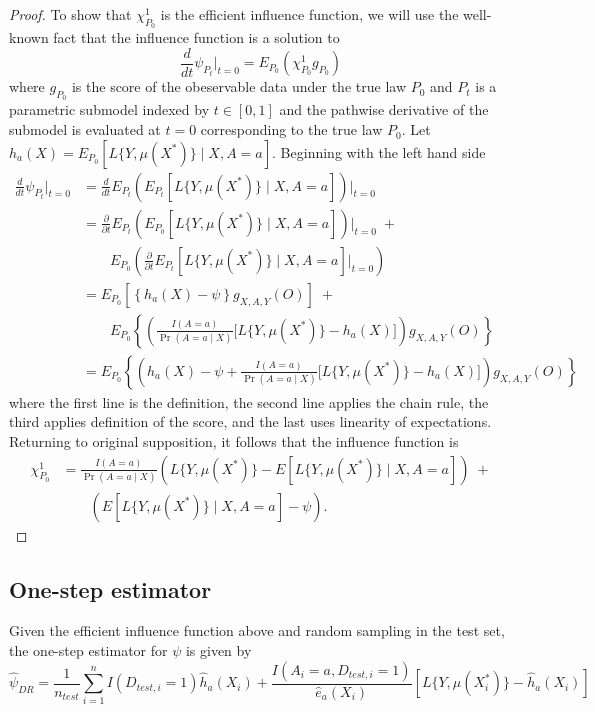 \begin{proof}
To show that $\chi_{P_0}^1$ is the efficient influence function, we will use the well-known fact that the influence function is a solution to 
\begin{equation*}
    \frac{d}{dt} \psi_{P_t}\bigg\vert_{t=0} = E_{P_0}(\chi_{P_0}^1g_{P_0})
\end{equation*}
where $g_{P_0}$ is the score of the obeservable data under the true law $P_0$ and $P_t$ is a parametric submodel indexed by $t \in [0,1]$ and the pathwise derivative of the submodel is evaluated at $t = 0$ corresponding to the true law $P_0$. Let $h_a(X) = E_{P_0}[L\{Y, \mu(X^*)\} \mid X, A=a]$. Beginning with the left hand side
\begin{align*}
    \frac{d}{dt} \psi_{P_t}\bigg\vert_{t=0} &=\frac{d}{dt} E_{P_t}\left(E_{P_t}[L\{Y, \mu(X^*)\} \mid X, A=a] \right)\bigg\vert_{t=0} \\
    &=\frac{\partial}{\partial t} E_{P_t}\left(E_{P_0}[L\{Y, \mu(X^*)\} \mid X, A=a] \right)\bigg\vert_{t=0} \;+ \\
    &\qquad  E_{P_0}\left(\frac{\partial}{\partial t} E_{P_t}[L\{Y, \mu(X^*)\} \mid X, A=a] \bigg\vert_{t=0} \right) \\
    &=E_{P_0}\left[\left\{h_a(X) - \psi \right\}g_{X, A, Y}(O)\right] \;+ \\
    &\qquad  E_{P_0}\left\{\left( \frac{I(A = a)}{\Pr(A = a \mid X)} \bigg[L\{Y, \mu(X^*)\} - h_a(X) \bigg]\right)g_{X, A, Y}(O)\right\} \\
    &= E_{P_0}\left\{\left(h_a(X) - \psi + \frac{I(A = a)}{\Pr(A = a \mid X)} \bigg[L\{Y, \mu(X^*)\} - h_a(X) \bigg]\right)g_{X, A, Y}(O)\right\} 
\end{align*}
where the first line is the definition, the second line applies the chain rule, the third applies definition of the score, and the last uses linearity of expectations. Returning to original supposition, it follows that the influence function is 
\begin{align*}
    \chi_{P_0}^1 &= \frac{I(A = a)}{\Pr(A = a \mid X)}(L\{Y, \mu(X^*)\} - E[L\{Y, \mu(X^*)\} \mid X, A=a])  \; + \\
    & \qquad (E[L\{Y, \mu(X^*)\} \mid X, A=a] - \psi).
\end{align*}
\end{proof}

\subsection{One-step estimator}
Given the efficient influence function above and  random sampling in the test set, the one-step estimator for $\psi$ is given by
\begin{equation*}
    \widehat{\psi}_{DR} = \frac{1}{n_{test}}\sum_{i=1}^n I(D_{test, i} = 1)\widehat{h}_a(X_i) + \frac{I(A_i = a, D_{test, i} = 1)}{\widehat{e}_a(X_i)} \left[ L\{Y, \mu(X^*_i)\} - \widehat{h}_a(X_i)\right]
\end{equation*}

